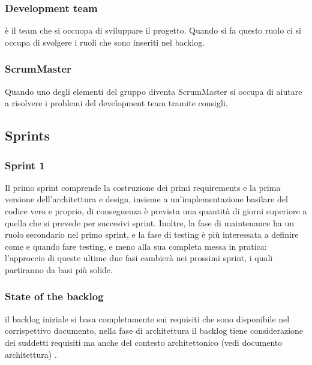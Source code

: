 \documentclass{article}
\begin{document}
\subsubsection{Development team} è il team che si occuopa di sviluppare il progetto. Quando si fa questo ruolo
ci si occupa di svolgere i ruoli che sono inseriti nel backlog.
\subsubsection{ScrumMaster} Quando uno degli elementi del gruppo diventa ScrumMaster
si occupa di aiutare a risolvere i problemi del development team tramite consigli.


\subsection{Sprints} 
\subsubsection{Sprint 1}
Il primo sprint comprende la costruzione dei primi requirements e la prima versione dell’architettura e design, insieme a un’implementazione basilare del codice vero e proprio, di conseguenza è prevista una quantità di giorni superiore a quella che si prevede per succesivi sprint. Inoltre, la fase di maintenance ha un ruolo secondario nel primo sprint, e la fase di testing è più interessata a definire come e quando fare testing, e meno alla sua completa messa in pratica: l’approccio di queste ultime due fasi cambierà nei prossimi sprint, i quali partiranno da basi più solide. 
\subsubsection{State of the backlog}
il backlog iniziale si basa completamente sui requisiti che sono disponibile nel corrispettivo documento, nella fase di architettura il backlog tiene considerazione dei suddetti requisiti ma anche del contesto architettonico (vedi documento architettura) . 
\end{document}

